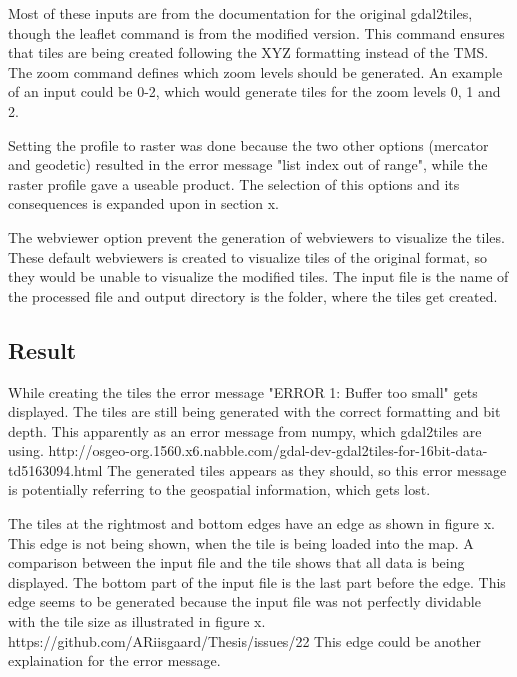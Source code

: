 Most of these inputs are from the documentation for the original gdal2tiles, though the leaflet command is from the modified version. This command ensures that tiles are being created following the XYZ formatting instead of the TMS. The zoom command defines which zoom levels should be generated. An example of an input could be 0-2, which would generate tiles for the zoom levels 0, 1 and 2. 

Setting the profile to raster was done because the two other options (mercator and geodetic) resulted in the error message "list index out of range", while the raster profile gave a useable product. The selection of this options and its consequences is expanded upon in section x.  

The webviewer option prevent the generation of webviewers to visualize the tiles. These default webviewers is created to visualize tiles of the original format, so they would be unable to visualize the modified tiles. 
The input file is the name of the processed file and output directory is the folder, where the tiles get created. 
\subsection{Result}

While creating the tiles the error message "ERROR 1: Buffer too small" gets displayed. The tiles are still being generated with the correct formatting and bit depth. This apparently as an error message from numpy, which gdal2tiles are using. 
http://osgeo-org.1560.x6.nabble.com/gdal-dev-gdal2tiles-for-16bit-data-td5163094.html
The generated tiles appears as they should, so this error message is potentially referring to the geospatial information, which gets lost.

The tiles at the rightmost and bottom edges have an edge as shown in figure x. This edge is not being shown, when the tile is being loaded into the map. A comparison between the input file and the tile shows that all data is being displayed. The bottom part of the input file is the last part before the edge. This edge seems to be generated because the input file was not perfectly dividable with the tile size as illustrated in figure x.
https://github.com/ARiisgaard/Thesis/issues/22
This edge could be another explaination for the error message. 






